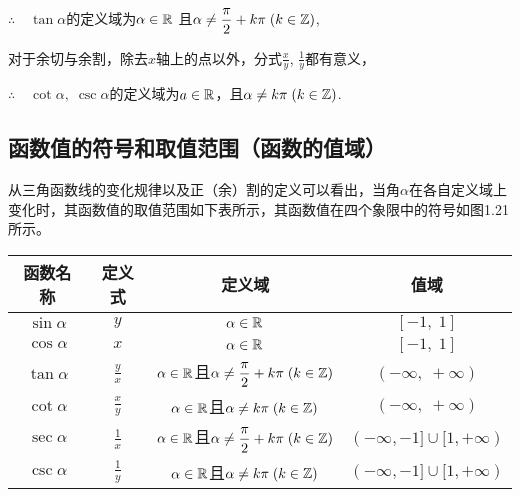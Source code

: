 $\therefore\quad \tan\alpha$的定义域为$\alpha\in\mathbb{R}$ 且$\alpha\ne \dfrac{\pi}{2}+k\pi\; (k\in\mathbb{Z})$, 

对于余切与余割，除去$x$轴上的点以外，分式$\frac{x}{y}$, $\frac{1}{y}$都有意义，

$\therefore\quad \cot\alpha,\; \csc\alpha$的定义域为$a\in\mathbb{R}$，且$\alpha\ne k\pi\; (k\in\mathbb{Z})$.

\subsection{函数值的符号和取值范围（函数的值域）}
从三角函数线的变化规律以及正（余）割的定义可以看出，当角$\alpha$在各自定义域上变化时，其函数值的取值范围如下表所示，其函数值在四个象限中的符号如图1.21所示。
\begin{center}
    \begin{tabular}{c|c|c|c}
\hline
函数名称& 定义式& 定义域& 值域\\
\hline
$\sin\alpha$ & $y$  &  $\alpha\in\mathbb{R}$ &  $[-1,\;1]$\\[1.5ex]
$\cos\alpha$ & $x$  &  $\alpha\in\mathbb{R}$ &  $[-1,\;1]$\\[1.5ex]
$\tan\alpha$ & $\frac{y}{x}$  &  $\alpha\in\mathbb{R}$且$\alpha\ne \dfrac{\pi}{2}+k\pi\; (k\in\mathbb{Z})$ &  $(-\infty,\;+\infty)$\\[1.5ex]
$\cot\alpha$ & $\frac{x}{y}$  &  $\alpha\in\mathbb{R}$且$\alpha\ne k\pi\; (k\in\mathbb{Z})$ &  $(-\infty,\;+\infty)$\\[1.5ex]
$\sec\alpha$ & $\frac{1}{x}$  &  $\alpha\in\mathbb{R}$且$\alpha\ne \dfrac{\pi}{2}+k\pi\; (k\in\mathbb{Z})$ &  $(-\infty,-1]\cup[1,+\infty)$\\[1.5ex]
$\csc\alpha$ & $\frac{1}{y}$  &  $\alpha\in\mathbb{R}$且$\alpha\ne k\pi\; (k\in\mathbb{Z})$ &  $(-\infty,-1]\cup[1, +\infty)$\\[1.5ex]
\hline
    \end{tabular}
\end{center}

